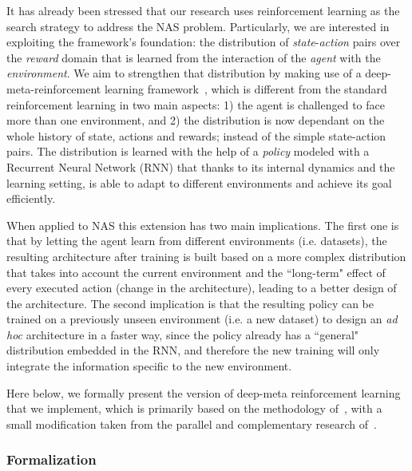 It has already been stressed that our research uses reinforcement learning as the search strategy to address the NAS problem. 
Particularly, we are interested in exploiting the framework's foundation: the distribution of \textit{state}-\textit{action} pairs over the \textit{reward} domain that is learned from the interaction of the \textit{agent} with the \textit{environment}. We aim to strengthen that distribution by making use of a deep-meta-reinforcement learning framework~\citep{LtRL, RL2}, which is different from the standard reinforcement learning in two main aspects: 1) the agent is challenged to face more than one environment, and 2) the distribution is now dependant on the whole history of state, actions and rewards; instead of the simple state-action pairs. The distribution is learned with the help of a \textit{policy} modeled with a Recurrent Neural Network (RNN) that thanks to its internal dynamics and the learning setting, is able to adapt to different environments and achieve its goal efficiently.

When applied to NAS this extension has two main implications. The first one is that by letting the agent learn from different environments (i.e. datasets), the resulting architecture after training is built based on a more complex distribution that takes into account the current environment and the ``long-term" effect of every executed action (change in the architecture), leading to a better design of the architecture. The second implication is that the resulting policy can be trained on a previously unseen environment (i.e. a new dataset) to design an \textit{ad hoc} architecture in a faster way, since the policy already has a ``general" distribution embedded in the RNN, and therefore the new training will only integrate the information specific to the new environment.

Here below, we formally present the version of deep-meta reinforcement learning that we implement, which is primarily based on the methodology of~\citet{LtRL}, with a small modification taken from the parallel and complementary research of~\citet{RL2}.

\subsubsection{Formalization}\label{sec:methodology:rl:formal}

